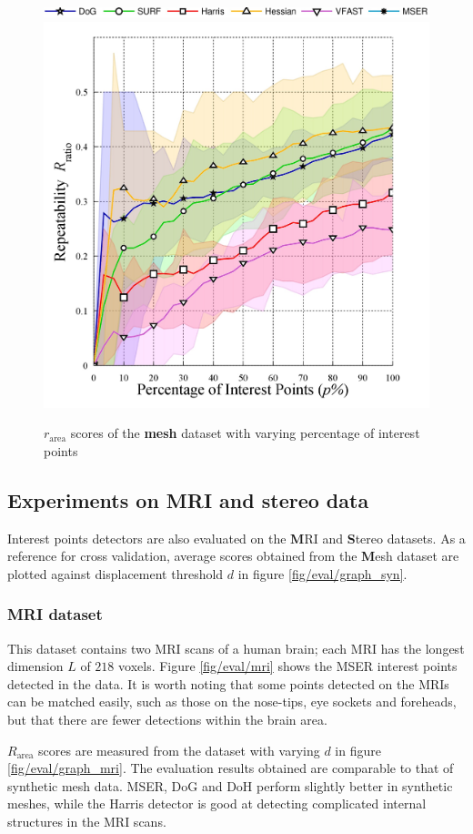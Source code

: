 \begin{figure}[ht]
	\centering
	\includegraphics[width=0.70\linewidth]{./fig/eval/hlegend.jpg} \\ 
	\includegraphics[width=0.48\linewidth]{./fig/eval/graph_keypointnum.jpg}
	\caption{$r_{\textrm{area}}$ scores of the \textbf{mesh} dataset with varying percentage of interest points}
	\label{fig/eval/graph_keypointnum}	
\end{figure}

\subsection{Experiments on MRI and stereo data}

Interest points detectors are also evaluated on the {\textbf MRI} and {\textbf Stereo} datasets.
As a reference for cross validation, average scores obtained from the {\textbf Mesh} dataset are plotted against displacement threshold $d$ in figure \ref{fig/eval/graph_syn}. 

\subsubsection{MRI dataset} This dataset contains two MRI scans of a human brain; each MRI has the longest dimension $L$ of $218$ voxels.
Figure \ref{fig/eval/mri} shows the MSER interest points detected in the data. It is worth noting that some points detected on the MRIs can be matched easily, such as those on the nose-tips, eye sockets and foreheads, but that there are fewer detections within the brain area.

$R_{\textrm{area}}$ scores are measured from the dataset with varying $d$ in figure \ref{fig/eval/graph_mri}. The evaluation results obtained are comparable to that of synthetic mesh data. MSER, DoG and DoH perform slightly better in synthetic meshes, while the Harris detector is good at detecting complicated internal structures in the MRI scans. 


